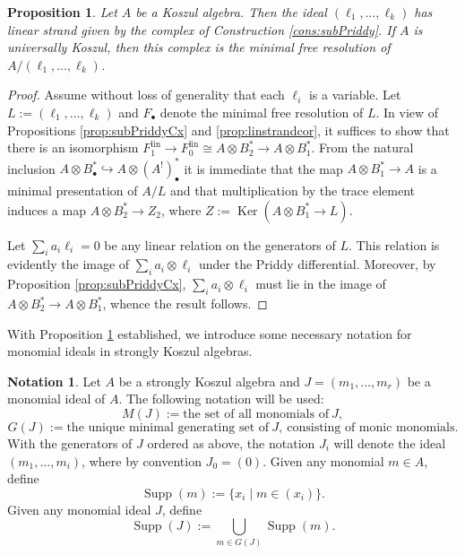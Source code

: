 \documentclass[10pt]{amsart}
\newtheorem{prop}[theorem]{Proposition}
\theoremstyle{definition}
\newtheorem{notation}[theorem]{Notation}
\theoremstyle{remark}
\newtheorem{the context}[theorem]{The Context}
\numberwithin{equation}{theorem}
\numberwithin{equation}{section}
\newcommand{\Ker}{\operatorname{Ker}}
\newcommand{\supp}{\operatorname{Supp}}
\renewcommand{\ker}{\Ker}
\newcommand{\lin}{\operatorname{lin}}
\begin{document}
\begin{prop}\label{prop:varslinRes}
Let $A$ be a Koszul algebra. Then the ideal $(\ell_1 , \dots , \ell_k)$ has linear strand given by the complex of Construction \ref{cons:subPriddy}. If $A$ is universally Koszul, then this complex is the minimal free resolution of $A/(\ell_1 , \dots , \ell_k)$.
\end{prop}

\begin{proof}
Assume without loss of generality that each $\ell_i$ is a variable. Let $L := (\ell_1 , \dots , \ell_k)$ and $F_\bullet$ denote the minimal free resolution of $L$. In view of Propositions \ref{prop:subPriddyCx} and \ref{prop:linstrandcor}, it suffices to show that there is an isomorphism $F_1^{\lin} \to F_0^{\lin} \cong A \otimes B_2^* \to A \otimes B_1^*$. From the natural inclusion $A \otimes B_\bullet^* \hookrightarrow A \otimes (A^!)^*_\bullet$ it is immediate that the map $A \otimes B_1^* \to A$ is a minimal presentation of $A/L$ and that multiplication by the trace element induces a map $A \otimes B_2^* \to Z_2$, where $Z := \ker (A \otimes B_1^* \to L)$.   

Let $\sum_i a_i \ell_i =0$ be any linear relation on the generators of $L$. This relation is evidently the image of $\sum_i a_i \otimes \ell_i$ under the Priddy differential. Moreover, by Proposition \ref{prop:subPriddyCx}, $\sum_i a_i \otimes \ell_i$ must lie in the image of $A \otimes B_2^* \to A \otimes B_1^*$, whence the result follows.
\end{proof}

With Proposition \ref{prop:varslinRes} established, we introduce some necessary notation for monomial ideals in strongly Koszul algebras.

\begin{notation}\label{not:MonIdeals}
Let $A$ be a strongly Koszul algebra and $J = (m_1 , \dots , m_r)$ be a monomial ideal of $A$. The following notation will be used:
$$M(J) := \textrm{the set of all monomials of} \ J,$$
$$G(J) := \textrm{the unique minimal generating set of} \ J, \ \textrm{consisting of monic monomials.}$$
With the generators of $J$ ordered as above, the notation $J_i$ will denote the ideal $(m_1 , \dots , m_i)$, where by convention $J_0 = (0)$. Given any monomial $m \in A$, define
$$\supp (m) := \{ x_i \mid m \in (x_i) \}.$$
Given any monomial ideal $J$, define
$$\supp (J) := \bigcup_{m \in G(J)} \supp (m).$$
\end{notation}
\end{document}
